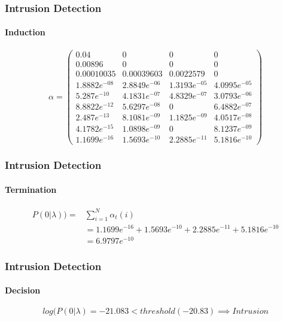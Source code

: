 \documentclass{beamer}
\begin{document}
\begin{frame}
  \frametitle{Intrusion Detection}
  \framesubtitle{Induction}
  $$
  \alpha = 
  \begin{pmatrix} 
    0.04 & 0 & 0 & 0\\
    0.00896 & 0 & 0 & 0\\
    0.00010035 & 0.00039603 & 0.0022579 & 0\\
    1.8882e^{-08} & 2.8849e^{-06} & 1.3193e^{-05} & 4.0995e^{-05}\\
    5.287e^{-10} & 4.1831e^{-07} & 4.8329e^{-07} & 3.0793e^{-06}\\
    8.8822e^{-12} & 5.6297e^{-08}& 0 & 6.4882e^{-07} \\
    2.487e^{-13} & 8.1081e^{-09} & 1.1825e^{-09} & 4.0517e^{-08}\\
    4.1782e^{-15} & 1.0898e^{-09} & 0& 8.1237e^{-09}\\
    1.1699e^{-16} & 1.5693e^{-10} & 2.2885e^{-11} & 5.1816e^{-10}
  \end{pmatrix}
  $$
\end{frame}
\begin{frame}
  \frametitle{Intrusion Detection}
  \framesubtitle{Termination}
  $$
  \begin{array}{ll}
    P(0|\lambda)) = &\sum\limits_{i=1}^N \alpha_t(i) \\
                   & = 1.1699e^{-16} + 1.5693e^{-10} + 2.2885e^{-11} + 5.1816e^{-10} \\
                   &= 6.9797e^{-10}
  \end{array}
$$
\end{frame}
\begin{frame}
  \frametitle{Intrusion Detection}
  \framesubtitle{Decision}
  $$
  log(P(0|\lambda) = -21.083 < threshold (-20.83) \implies Intrusion
  $$
\end{frame}
\end{document}
